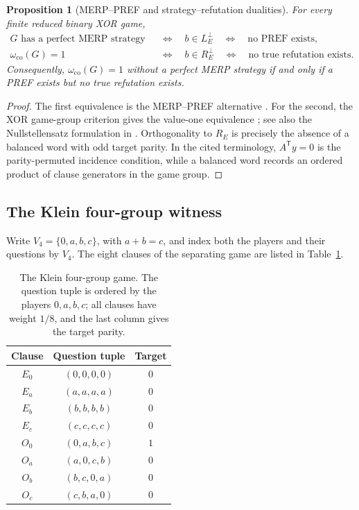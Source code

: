 \documentclass[11pt]{article}
\newtheorem{proposition}[theorem]{Proposition}
\theoremstyle{definition}
\theoremstyle{remark}
\numberwithin{equation}{section}
\begin{document}
\begin{proposition}[MERP--PREF and strategy--refutation dualities]
\label{prop:obstruction-dualities}
For every finite reduced binary XOR game,
\begin{align}
  G\text{ has a perfect MERP strategy}
  &\quad\Longleftrightarrow\quad b\in L_E^\perp
  \quad\Longleftrightarrow\quad\text{no PREF exists},
  \label{eq:merp-main}\\
  \omega_{\mathrm{co}}(G)=1
  &\quad\Longleftrightarrow\quad b\in R_E^\perp
  \quad\Longleftrightarrow\quad\text{no true refutation exists}.
  \label{eq:co-main}
\end{align}
Consequently, \(\omega_{\mathrm{co}}(G)=1\) without a perfect MERP strategy
if and only if a PREF exists but no true refutation exists.
\end{proposition}

\begin{proof}
The first equivalence is the MERP--PREF alternative
\cite[Theorem~21 and ~22]{WattsHarrowKanwarNatarajan2019}.
For the second, the XOR game-group criterion gives the value-one equivalence
\cite[Theorem~2.1]{WattsHelton2023}; see also the
Nullstellensatz formulation in \cite[Sec.~3.5.1, Theorem~5.12, and Sec.~5.3.2]{WattsHeltonKlep2023}.  Orthogonality to
\(R_E\) is precisely the absence of a balanced word with odd target parity.
In the cited terminology, \(A^{\mathsf T}y=0\) is the parity-permuted
incidence condition, while a balanced word records an ordered product of
clause generators in the game group.
\end{proof}

\subsection{The Klein four-group witness}\label{sec:klein-witness}

Write \(V_4=\{0,a,b,c\}\), with \(a+b=c\), and index both the players and
their questions by \(V_4\).  The eight clauses of the separating game are
listed in Table~\ref{tab:klein}.

\begin{table}[htbp]
\centering
\caption{The Klein four-group game.  The question tuple is ordered by the
players \(0,a,b,c\); all clauses have weight \(1/8\), and the last column
gives the target parity.}
\label{tab:klein}
\begin{tabular}{ccc}
\toprule
Clause & Question tuple & Target\\
\midrule
\(E_0\) & \((0,0,0,0)\) & \(0\)\\
\(E_a\) & \((a,a,a,a)\) & \(0\)\\
\(E_b\) & \((b,b,b,b)\) & \(0\)\\
\(E_c\) & \((c,c,c,c)\) & \(0\)\\
\(O_0\) & \((0,a,b,c)\) & \(1\)\\
\(O_a\) & \((a,0,c,b)\) & \(0\)\\
\(O_b\) & \((b,c,0,a)\) & \(0\)\\
\(O_c\) & \((c,b,a,0)\) & \(0\)\\
\bottomrule
\end{tabular}
\end{table}
\end{document}
